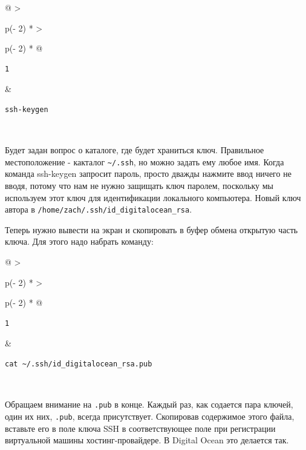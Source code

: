 \documentclass{article}
\begin{document}
\begin{longtable}[]{@{}
  >{\raggedright\arraybackslash}p{(\columnwidth - 2\tabcolsep) * }
  >{\raggedright\arraybackslash}p{(\columnwidth - 2\tabcolsep) * }@{}}
\toprule
\endhead
\begin{minipage}[t]{\linewidth}\raggedright
\begin{verbatim}
1
\end{verbatim}
\end{minipage} & \begin{minipage}[t]{\linewidth}\raggedright
\begin{verbatim}
ssh-keygen
\end{verbatim}
\end{minipage} \\ \addlinespace
\bottomrule
\end{longtable}

Будет задан вопрос о каталоге, где будет храниться ключ. Правильное
местоположение - какталог \texttt{\textasciitilde{}/.ssh}, но можно
задать ему любое имя. Когда команда ssh-keygen запросит пароль, просто
дважды нажмите ввод ничего не вводя, потому что нам не нужно защищать
ключ паролем, поскольку мы используем этот ключ для идентификации
локального компьютера. Новый ключ автора в
\texttt{/home/zach/.ssh/id\_digitalocean\_rsa}.

Теперь нужно вывести на экран и скопировать в буфер обмена открытую
часть ключа. Для этого надо набрать команду:

\begin{longtable}[]{@{}
  >{\raggedright\arraybackslash}p{(\columnwidth - 2\tabcolsep) * }
  >{\raggedright\arraybackslash}p{(\columnwidth - 2\tabcolsep) * }@{}}
\toprule
\endhead
\begin{minipage}[t]{\linewidth}\raggedright
\begin{verbatim}
1
\end{verbatim}
\end{minipage} & \begin{minipage}[t]{\linewidth}\raggedright
\begin{verbatim}
cat ~/.ssh/id_digitalocean_rsa.pub
\end{verbatim}
\end{minipage} \\ \addlinespace
\bottomrule
\end{longtable}

Обращаем внимание на \texttt{.pub} в конце. Каждый раз, как содается
пара ключей, один их них, \texttt{.pub}, всегда присутствует. Скопировав
содержимое этого файла, вставьте его в поле ключа SSH в соответствующее
поле при регистрации виртуальной машины хостинг-провайдере. В Digital
Ocean это делается так.
\end{document}
